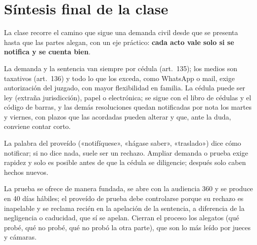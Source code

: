 \documentclass[12pt,oneside]{book}
\begin{document}
\chapter[Síntesis final]{Síntesis final de la clase}

La clase recorre el camino que sigue una demanda civil desde que se presenta hasta que las partes alegan, con un eje práctico: \textbf{cada acto vale solo si se notifica y se cuenta bien}.

La demanda y la sentencia van siempre por cédula (art.\ 135); los medios son taxativos (art.\ 136) y todo lo que los exceda, como WhatsApp o mail, exige autorización del juzgado, con mayor flexibilidad en familia. La cédula puede ser ley (extraña jurisdicción), papel o electrónica; se sigue con el libro de cédulas y el código de barras, y las demás resoluciones quedan notificadas por nota los martes y viernes, con plazos que las acordadas pueden alterar y que, ante la duda, conviene contar corto.

La palabra del proveído («notifíquese», «hágase saber», «traslado») dice cómo notificar; si no dice nada, suele ser un rechazo. Ampliar demanda o prueba exige rapidez y solo es posible antes de que la cédula se diligencie; después solo caben hechos nuevos.

La prueba se ofrece de manera fundada, se abre con la audiencia 360 y se produce en 40 días hábiles; el proveído de prueba debe controlarse porque su rechazo es inapelable y se reclama recién en la apelación de la sentencia, a diferencia de la negligencia o caducidad, que sí se apelan. Cierran el proceso los alegatos (qué probé, qué no probé, qué no probó la otra parte), que son lo más leído por jueces y cámaras.
\end{document}
